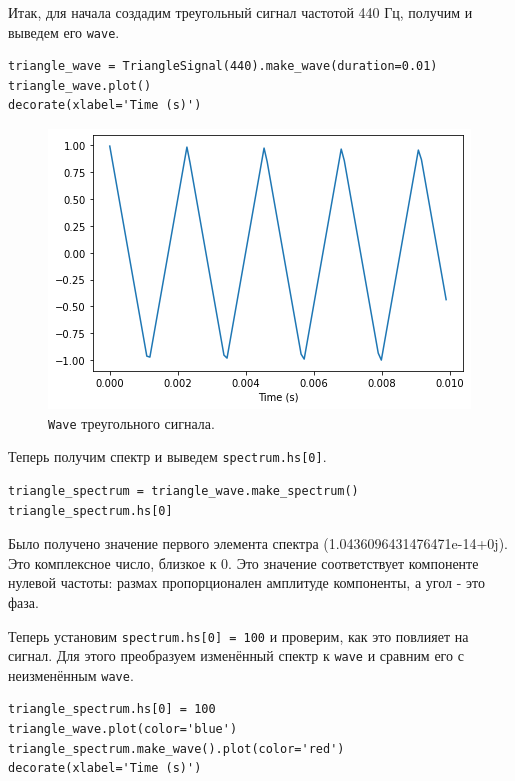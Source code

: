 \documentclass[a4paper, 14pt]{extarticle}
\begin{document}
    Итак, для начала создадим треугольный сигнал частотой 440 Гц, получим и выведем его \texttt{wave}.

    \begin{lstlisting}[caption= Создание сигнала и получение\texttt{wave}., label={lst:task4_wave}]
triangle_wave = TriangleSignal(440).make_wave(duration=0.01)
triangle_wave.plot()
decorate(xlabel='Time (s)')
    \end{lstlisting}

    \begin{figure}[h]
        \centering
        \includegraphics[width=0.8\linewidth]{resources/Images/task4_wave}
        \caption{\texttt{Wave} треугольного сигнала.}
        \label{fig:task4_wave}
    \end{figure}

    Теперь получим спектр и выведем \texttt{spectrum.hs[0]}.

    \begin{lstlisting}[caption= Получение спектра и вывод \texttt{spectrum.hs[0]}., label={lst:task4_spectrum_hs}]
triangle_spectrum = triangle_wave.make_spectrum()
triangle_spectrum.hs[0]
    \end{lstlisting}

    Было получено значение первого элемента спектра (1.0436096431476471e-14+0j). Это комплексное число, близкое к 0.
    Это значение соответствует компоненте нулевой частоты: размах пропорционален амплитуде компоненты,
    а угол - это фаза.

    Теперь установим \texttt{spectrum.hs[0] = 100} и проверим, как это повлияет на сигнал.
    Для этого преобразуем изменённый спектр к \texttt{wave} и сравним его с неизменённым \texttt{wave}.

    \begin{lstlisting}[caption= Изменение первого элемента спектра и сравнение с первоначальным., label={lst:task4_editing_hs_and_copmare}]
triangle_spectrum.hs[0] = 100
triangle_wave.plot(color='blue')
triangle_spectrum.make_wave().plot(color='red')
decorate(xlabel='Time (s)')
    \end{lstlisting}
\end{document}
